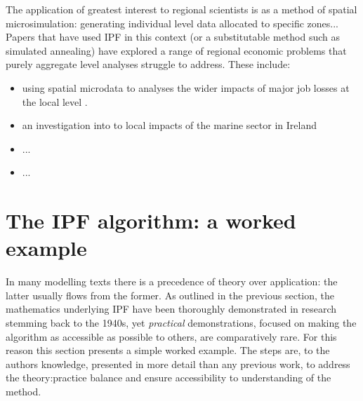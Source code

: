 \documentclass[a4paper,10pt]{article}
\begin{document}
The application of greatest interest to regional scientists is as a method of 
spatial microsimulation: generating individual level data allocated to specific zones...
Papers that have used IPF in this context (or a substitutable method such as simulated annealing)
have explored a range of regional economic problems that purely aggregate level analyses struggle to address.
These include:
\begin{itemize}
 \item using spatial microdata to analyses the wider impacts of major job losses
at the local level \citep{Ballas2006}.
\item an investigation into to local impacts of the marine sector in Ireland \citep{Morrissey2013a}
\item ...
\item ...
\end{itemize}

% 
\section{The IPF algorithm: a worked example} \label{s:theory}
In many modelling texts there is a precedence of theory over
application: the latter usually flows from the former.  
As outlined in the previous section, the mathematics underlying IPF have
been thoroughly demonstrated in research stemming back to the 1940s,
yet \emph{practical} demonstrations, focused on making the
algorithm as accessible as possible to others,
are comparatively rare. For this reason this section presents a
simple worked example. The steps are, to the authors knowledge, presented in
more detail than any previous work, to address the theory:practice balance and
ensure accessibility to understanding of the method.
\end{document}

